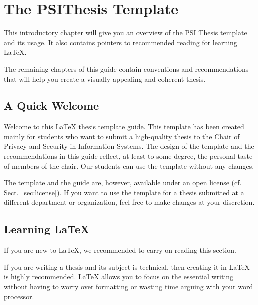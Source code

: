 \chapter{The PSIThesis Template} %

\label{Chapter1} %


This introductory chapter will give you an overview of the PSI Thesis template and its usage.
It also contains pointers to recommended reading for learning \LaTeX{}.

The remaining chapters of this guide contain conventions and recommendations that will help you create a visually appealing and coherent thesis.

\section{A Quick Welcome}

Welcome to this LaTeX thesis template guide.%
This template has been created mainly for students who want to submit a high-quality thesis to the Chair of Privacy and Security in Information Systems. The design of the template and the recommendations in this guide reflect, at least to some degree, the personal taste of members of the chair. Our students can use the template without any changes.

The template and the guide are, however, available under an open license (cf. Sect.~\ref{sec:license}). If you want to use the template for a thesis submitted at a different department or organization, feel free to make changes at your discretion.


\section{Learning LaTeX}

If you are new to LaTeX, we recommended to carry on reading this section.

If you are writing a thesis and its subject is technical, then creating it in LaTeX is highly recommended. LaTeX allows you to focus on the essential writing without having to worry over formatting or wasting time arguing with your word processor.

